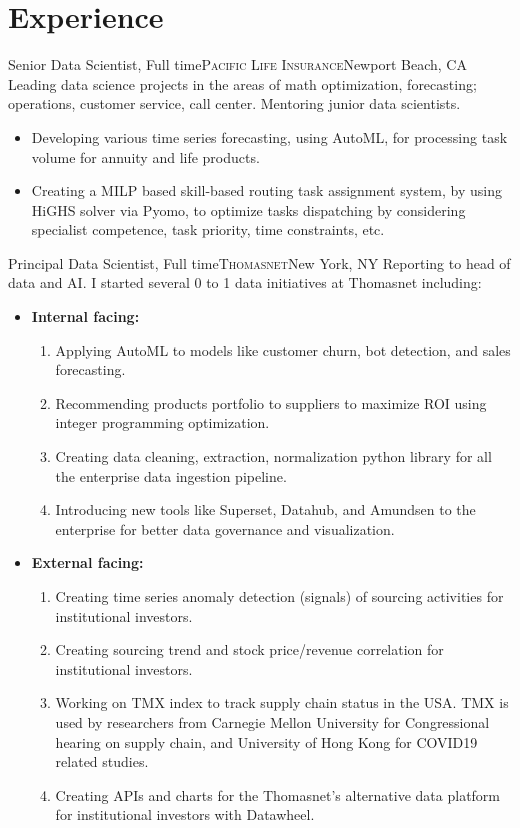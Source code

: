 \documentclass[12pt,a4paper,sans]{moderncv} %
\begin{document}
\section{Experience}
 {Senior Data Scientist, Full time}{\textsc{Pacific Life Insurance}}{Newport Beach, CA}{}{}
Leading data science projects in the areas of math optimization, forecasting; operations, customer service, call center. Mentoring junior data scientists.
\begin{itemize}
\item Developing various time series forecasting, using AutoML, for processing task volume for annuity and life products.
\item Creating a MILP based skill-based routing task assignment system, by using HiGHS solver via Pyomo, to optimize tasks dispatching by considering specialist competence, task priority, time constraints, etc.


\end{itemize}


\bigskip
 
 {Principal Data Scientist, Full time}{\textsc{Thomasnet}}{New York, NY}{}{
Reporting to head of data and AI. I started several 0 to 1 data initiatives at Thomasnet including:}
\begin{itemize}
\item \textbf{Internal facing:}
    \begin{enumerate}
    \item Applying AutoML to models like customer churn, bot detection, and sales forecasting.
    \item Recommending products portfolio to suppliers to maximize ROI using integer programming optimization.
    \item  Creating data cleaning, extraction, normalization python library for all the enterprise data ingestion pipeline.
    \item Introducing new tools like Superset, Datahub, and Amundsen to the enterprise for better data governance and visualization.
    \end{enumerate}
\item \textbf{External facing:}
    \begin{enumerate}
    \item Creating time series anomaly detection (signals) of sourcing activities for institutional investors.
    \item Creating sourcing trend and stock price/revenue correlation for institutional investors.
    \item Working on TMX index to track supply chain status in the USA. TMX is used by researchers from Carnegie Mellon University for Congressional hearing on supply chain, and University of Hong Kong for COVID19 related studies.
    \item Creating APIs and charts for the Thomasnet's alternative data platform for institutional investors with Datawheel.
    \end{enumerate}
\end{itemize}
 \bigskip
\end{document}
